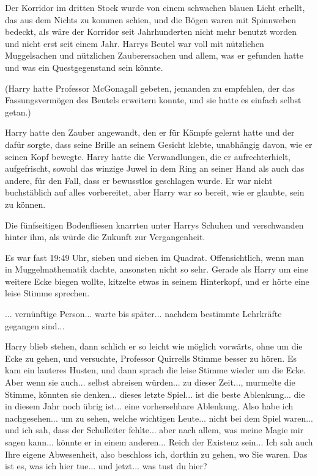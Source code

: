 Der Korridor im dritten Stock wurde von einem schwachen blauen Licht erhellt,
das aus dem Nichts zu kommen schien, und die Bögen waren mit Spinnweben bedeckt,
als wäre der Korridor seit Jahrhunderten nicht mehr benutzt worden und nicht
erst seit einem Jahr. Harrys Beutel war voll mit nützlichen Muggelsachen und
nützlichen Zauberersachen und allem, was er gefunden hatte und was ein
Questgegenstand sein könnte.

(Harry hatte Professor McGonagall gebeten, jemanden zu empfehlen, der das
Fassungsvermögen des Beutels erweitern konnte, und sie hatte es einfach selbst
getan.)

Harry hatte den Zauber angewandt, den er für Kämpfe gelernt hatte und der dafür
sorgte, dass seine Brille an seinem Gesicht klebte, unabhängig davon, wie er
seinen Kopf bewegte. Harry hatte die Verwandlungen, die er aufrechterhielt,
aufgefrischt, sowohl das winzige Juwel in dem Ring an seiner Hand als auch das
andere, für den Fall, dass er bewusstlos geschlagen wurde. Er war nicht
buchstäblich auf alles vorbereitet, aber Harry war so bereit, wie er glaubte,
sein zu können.

Die fünfseitigen Bodenfliesen knarrten unter Harrys Schuhen und verschwanden
hinter ihm, als würde die Zukunft zur Vergangenheit.

Es war fast 19:49 Uhr, sieben und sieben im Quadrat. Offensichtlich, wenn man in
Muggelmathematik dachte, ansonsten nicht so sehr. Gerade als Harry um eine
weitere Ecke biegen wollte, kitzelte etwas in seinem Hinterkopf, und er hörte
eine leise Stimme sprechen.

\glqq{}... vernünftige Person... warte bis später... nachdem bestimmte Lehrkräfte
gegangen sind...\grqq{}

Harry blieb stehen, dann schlich er so leicht wie möglich vorwärts, ohne um die
Ecke zu gehen, und versuchte, Professor Quirrells Stimme besser zu hören. Es kam
ein lauteres Husten, und dann sprach die leise Stimme wieder um die Ecke. \glqq{}
Aber wenn sie auch... selbst abreisen würden... zu dieser Zeit...\grqq{},
murmelte die Stimme, \glqq{}könnten sie denken... dieses letzte Spiel... ist die
beste Ablenkung... die in diesem Jahr noch übrig ist... eine vorhersehbare
Ablenkung. Also habe ich nachgesehen... um zu sehen, welche wichtigen Leute...
nicht bei dem Spiel waren... und ich sah, dass der Schulleiter fehlte... aber
nach allem, was meine Magie mir sagen kann... könnte er in einem anderen...
Reich der Existenz sein... Ich sah auch Ihre eigene Abwesenheit, also beschloss
ich, dorthin zu gehen, wo Sie waren. Das ist es, was ich hier tue... und
jetzt... was tust du hier?\grqq{}

